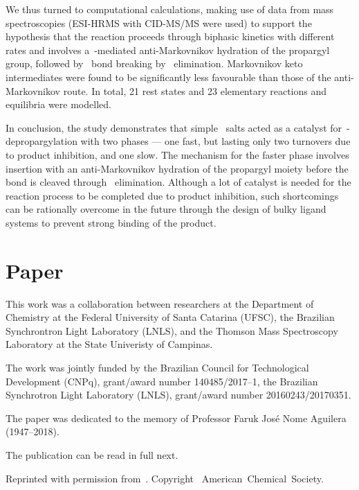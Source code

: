 We thus turned to computational calculations,
making use of data from mass spectroscopies (ESI-HRMS with CID-MS/MS were used) to support the hypothesis
that the reaction proceeds through biphasic kinetics with different rates
and
involves a~-mediated anti-Markovnikov hydration of the propargyl group,
followed by~ bond breaking by~ elimination.
Markovnikov keto intermediates were found to be significantly less favourable than those of the anti-Markovnikov route.
In total, 21 rest states and 23 elementary reactions and equilibria were modelled.

In conclusion,
the study demonstrates that
simple~ salts acted as a catalyst for~-depropargylation with two phases --- one fast,
but lasting only two turnovers due to product inhibition,
and one slow.
The mechanism for the faster phase involves~ insertion
with an anti-Markovnikov hydration of the propargyl moiety before the~ bond is cleaved
through~ elimination.
Although a lot of catalyst is needed for the reaction process to be completed due to product inhibition,
such shortcomings can be rationally overcome in the future
through the design of bulky ligand systems
to prevent strong binding of the product.

\section{Paper}

This work was a collaboration between researchers
at the Department of Chemistry at the Federal University of Santa Catarina (UFSC),
the Brazilian Synchrontron Light Laboratory (LNLS),
and the Thomson Mass Spectroscopy Laboratory at the State Univeristy of Campinas.

The work was jointly funded by the Brazilian Council for Technological Development (CNPq),
grant/award number 140485/2017--1,
the Brazilian Synchrotron Light Laboratory (LNLS),
grant/award number 20160243/20170351.

The paper was dedicated to the memory of Professor Faruk José Nome Aguilera (1947--2018).

The publication can be read in full next.

Reprinted with permission from~.
Copyright~\citeyear{Coelho_2019}
American~Chemical~Society.



